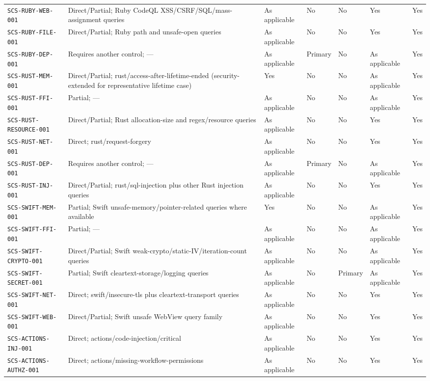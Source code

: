 \documentclass[10pt,letterpaper]{article}
\newcommand{\code}[1]{\begingroup\small\ttfamily\def\UrlFont{\ttfamily}\nolinkurl{#1}\endgroup}
\begin{document}
\begin{landscape}
\begin{longtable}{@{}P{1.4in}P{1.35in}P{1.1in}P{1.1in}P{0.95in}P{1.3in}P{1.0in}@{}}
\code{SCS-RUBY-WEB-001} & Direct/Partial; Ruby CodeQL XSS/CSRF/SQL/mass-assignment queries & As applicable & No & No & Yes & Yes\\
\code{SCS-RUBY-FILE-001} & Direct/Partial; Ruby path and unsafe-open queries & As applicable & No & No & Yes & Yes\\
\code{SCS-RUBY-DEP-001} & Requires another control; — & As applicable & Primary & No & As applicable & Yes\\
\code{SCS-RUST-MEM-001} & Direct/Partial; rust/access-after-lifetime-ended (security-extended for representative lifetime case) & Yes & No & No & As applicable & Yes\\
\code{SCS-RUST-FFI-001} & Partial; — & As applicable & No & No & As applicable & Yes\\
\code{SCS-RUST-RESOURCE-001} & Direct/Partial; Rust allocation-size and regex/resource queries & As applicable & No & No & Yes & Yes\\
\code{SCS-RUST-NET-001} & Direct; rust/request-forgery & As applicable & No & No & Yes & Yes\\
\code{SCS-RUST-DEP-001} & Requires another control; — & As applicable & Primary & No & As applicable & Yes\\
\code{SCS-RUST-INJ-001} & Direct/Partial; rust/sql-injection plus other Rust injection queries & As applicable & No & No & Yes & Yes\\
\code{SCS-SWIFT-MEM-001} & Partial; Swift unsafe-memory/pointer-related queries where available & Yes & No & No & As applicable & Yes\\
\code{SCS-SWIFT-FFI-001} & Partial; — & As applicable & No & No & As applicable & Yes\\
\code{SCS-SWIFT-CRYPTO-001} & Direct/Partial; Swift weak-crypto/static-IV/iteration-count queries & As applicable & No & No & As applicable & Yes\\
\code{SCS-SWIFT-SECRET-001} & Partial; Swift cleartext-storage/logging queries & As applicable & No & Primary & As applicable & Yes\\
\code{SCS-SWIFT-NET-001} & Direct; swift/insecure-tls plus cleartext-transport queries & As applicable & No & No & Yes & Yes\\
\code{SCS-SWIFT-WEB-001} & Direct/Partial; Swift unsafe WebView query family & As applicable & No & No & Yes & Yes\\
\code{SCS-ACTIONS-INJ-001} & Direct; actions/code-injection/critical & As applicable & No & No & Yes & Yes\\
\code{SCS-ACTIONS-AUTHZ-001} & Direct; actions/missing-workflow-permissions & As applicable & No & No & Yes & Yes\\

\end{longtable}
\end{landscape}
\end{document}

